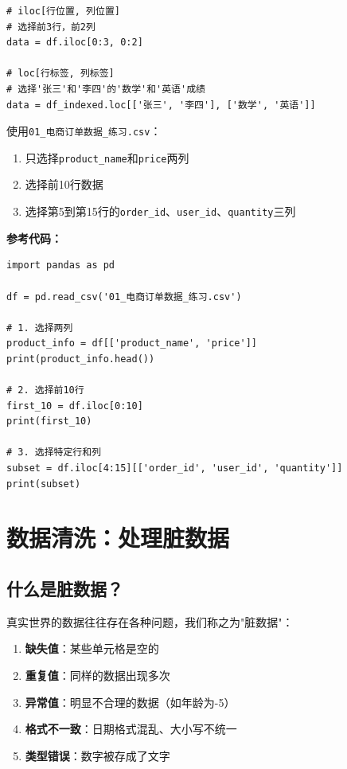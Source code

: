 \documentclass[12pt,a4paper]{article}
\begin{document}
\begin{lstlisting}[caption={同时选择行和列}]
# iloc[行位置, 列位置]
# 选择前3行，前2列
data = df.iloc[0:3, 0:2]

# loc[行标签, 列标签]
# 选择'张三'和'李四'的'数学'和'英语'成绩
data = df_indexed.loc[['张三', '李四'], ['数学', '英语']]
\end{lstlisting}

\begin{practicebox}[动手练习3]
使用\texttt{01\_电商订单数据\_练习.csv}：

\begin{enumerate}
    \item 只选择\texttt{product\_name}和\texttt{price}两列
    \item 选择前10行数据
    \item 选择第5到第15行的\texttt{order\_id}、\texttt{user\_id}、\texttt{quantity}三列
\end{enumerate}

\textbf{参考代码：}
\begin{lstlisting}
import pandas as pd

df = pd.read_csv('01_电商订单数据_练习.csv')

# 1. 选择两列
product_info = df[['product_name', 'price']]
print(product_info.head())

# 2. 选择前10行
first_10 = df.iloc[0:10]
print(first_10)

# 3. 选择特定行和列
subset = df.iloc[4:15][['order_id', 'user_id', 'quantity']]
print(subset)
\end{lstlisting}
\end{practicebox}

\section{数据清洗：处理脏数据}

\subsection{什么是脏数据？}

\begin{knowledgebox}
真实世界的数据往往存在各种问题，我们称之为"脏数据"：

\begin{enumerate}
    \item \textbf{缺失值}：某些单元格是空的
    \item \textbf{重复值}：同样的数据出现多次
    \item \textbf{异常值}：明显不合理的数据（如年龄为-5）
    \item \textbf{格式不一致}：日期格式混乱、大小写不统一
    \item \textbf{类型错误}：数字被存成了文字
\end{enumerate}
\end{knowledgebox}
\end{document}
